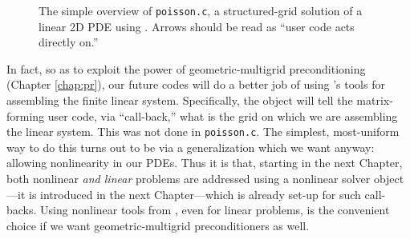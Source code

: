 \begin{figure}
\caption{The simple overview of \texttt{poisson.c}, a structured-grid solution of a linear 2D PDE using \PETSc.  Arrows should be read as ``user code acts directly on.''}
\label{fig:st:linearstack}
\end{figure}

In fact, so as to exploit the power of geometric-multigrid preconditioning (Chapter \ref{chap:pr}), our future codes will do a better job of using \PETSc's tools for assembling the finite linear system.  Specifically, the \pDMDA object will tell the matrix-forming user code, via ``call-back,'' what is the grid on which we are assembling the linear system.  This was not done in \texttt{poisson.c}.  The simplest, most-uniform way to do this turns out to be via a generalization which we want anyway: allowing nonlinearity in our PDEs.  Thus it is that, starting in the next Chapter, both nonlinear \emph{and linear} problems are addressed using a \pSNES nonlinear solver object---it is introduced in the next Chapter---which is already set-up for such call-backs.  Using nonlinear tools from \PETSc, even for linear problems, is the convenient choice if we want geometric-multigrid preconditioners as well.


